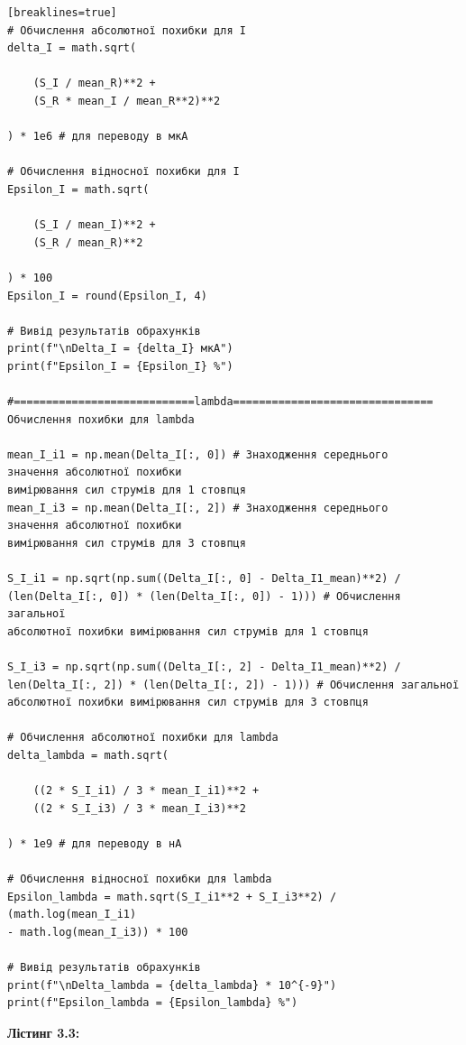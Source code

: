 \documentclass[12pt,a4paper]{article}
\begin{document}
{\begin{verbatim}[breaklines=true]
# Обчислення абсолютної похибки для I
delta_I = math.sqrt(

    (S_I / mean_R)**2 +
    (S_R * mean_I / mean_R**2)**2

) * 1e6 # для переводу в мкА

# Обчислення відносної похибки для I
Epsilon_I = math.sqrt(

    (S_I / mean_I)**2 +
    (S_R / mean_R)**2

) * 100
Epsilon_I = round(Epsilon_I, 4)

# Вивід результатів обрахунків
print(f"\nDelta_I = {delta_I} мкА")
print(f"Epsilon_I = {Epsilon_I} %")

#============================lambda===============================
Обчислення похибки для lambda

mean_I_i1 = np.mean(Delta_I[:, 0]) # Знаходження середнього
значення абсолютної похибки
вимірювання сил струмів для 1 стовпця
mean_I_i3 = np.mean(Delta_I[:, 2]) # Знаходження середнього
значення абсолютної похибки
вимірювання сил струмів для 3 стовпця

S_I_i1 = np.sqrt(np.sum((Delta_I[:, 0] - Delta_I1_mean)**2) /
(len(Delta_I[:, 0]) * (len(Delta_I[:, 0]) - 1))) # Обчислення загальної
абсолютної похибки вимірювання сил струмів для 1 стовпця

S_I_i3 = np.sqrt(np.sum((Delta_I[:, 2] - Delta_I1_mean)**2) / 
len(Delta_I[:, 2]) * (len(Delta_I[:, 2]) - 1))) # Обчислення загальної
абсолютної похибки вимірювання сил струмів для 3 стовпця

# Обчислення абсолютної похибки для lambda
delta_lambda = math.sqrt(

    ((2 * S_I_i1) / 3 * mean_I_i1)**2 +
    ((2 * S_I_i3) / 3 * mean_I_i3)**2

) * 1e9 # для переводу в нА

# Обчислення відносної похибки для lambda
Epsilon_lambda = math.sqrt(S_I_i1**2 + S_I_i3**2) / (math.log(mean_I_i1)
- math.log(mean_I_i3)) * 100

# Вивід результатів обрахунків
print(f"\nDelta_lambda = {delta_lambda} * 10^{-9}")
print(f"Epsilon_lambda = {Epsilon_lambda} %")
    \end{verbatim}}

    \vspace{3em}

    \hypertarget{listing3}{}

    \textbf{\large Лістинг 3.3:}

    \vspace{1em}
\end{document}

